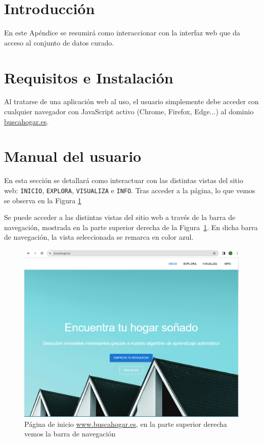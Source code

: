
\section{Introducción}

En este Apéndice se resumirá como interaccionar con la interfaz web que da acceso al conjunto de datos curado.

\section{Requisitos e Instalación}

Al tratarse de una aplicación web al uso, el usuario simplemente debe acceder con cualquier navegador con JavaScript activo (Chrome, Firefox, Edge...) al dominio \href{https://www.buscahogar.es}{buscahogar.es}.

\clearpage
\section{Manual del usuario}

En esta sección se detallará como interactuar con las distintas vistas del sitio web: \texttt{INICIO}, \texttt{EXPLORA}, \texttt{VISUALIZA} e \texttt{INFO}. Tras acceder a la página, lo que vemos se observa en la Figura \ref{fig:inicio_0}



Se puede acceder a las distintas vistas del sitio web a través de la barra de navegación, mostrada en la parte superior derecha de la Figura~\ref{fig:inicio_0}. En dicha barra de navegación, la vista seleccionada se remarca en color azul.

\begin{figure}[ht]
    \centering
	\includegraphics[width=1\textwidth]{img/inicio_0.PNG}
	\caption[Página de inicio \url{www.buscahogar.es}]{Página de inicio \url{www.buscahogar.es}, en la parte superior derecha vemos la barra de navegación}
	\label{fig:inicio_0}
\end{figure}

